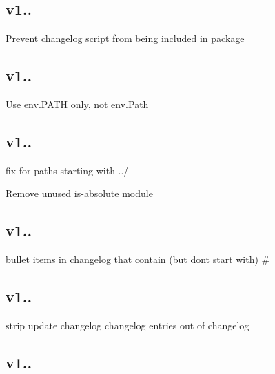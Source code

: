 \subsection*{v1..}


\begin{DoxyItemize}
\item Prevent changelog script from being included in package
\end{DoxyItemize}

\subsection*{v1..}


\begin{DoxyItemize}
\item Use env.\+P\+A\+TH only, not env.\+Path
\end{DoxyItemize}

\subsection*{v1..}


\begin{DoxyItemize}
\item fix for paths starting with ../
\item Remove unused {\ttfamily is-\/absolute} module
\end{DoxyItemize}

\subsection*{v1..}


\begin{DoxyItemize}
\item bullet items in changelog that contain (but don\textquotesingle{}t start with) \#
\end{DoxyItemize}

\subsection*{v1..}


\begin{DoxyItemize}
\item strip \textquotesingle{}update changelog\textquotesingle{} changelog entries out of changelog
\end{DoxyItemize}

\subsection*{v1..}


